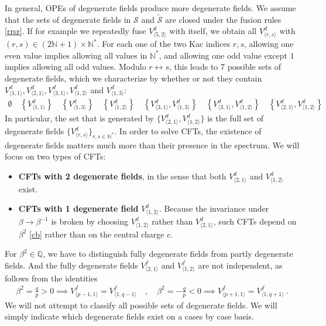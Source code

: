 \documentclass[12pt, a4paper]{article}
\theoremstyle{break}
\begin{document}
In general, OPEs of degenerate fields produce more degenerate fields. We assume that the sets of degenerate fields in $\mathcal{S}$ and $\widetilde{\mathcal{S}}$ are closed under the fusion rules \eqref{rrsr}. If for example we repeatedly fuse $V^d_{\langle 5,2\rangle}$ with itself, we obtain all $V^d_{\langle r,s\rangle}$ with $(r,s)\in (2\mathbb{N}+1)\times \mathbb{N}^*$. For each one of the two Kac indices $r,s$, allowing one even value implies allowing all values in $\mathbb{N}^*$, and allowing one odd value except $1$ implies allowing all odd values. Modulo $r\leftrightarrow s$, this leads to 7 possible sets of degenerate fields, which we characterize by whether or not they contain $V^d_{\langle 1,1\rangle}, V^d_{\langle 2,1\rangle},V^d_{\langle 3,1\rangle},V^d_{\langle 1,2\rangle}$ and $V^d_{\langle 1,3\rangle}$:
\begin{align}
  \emptyset \quad \left\{V^d_{\langle 1,1\rangle}\right\}  \quad \left\{V^d_{\langle 1,3\rangle}\right\} \quad \left\{V^d_{\langle 1,2\rangle}\right\} 
  \quad 
  \left\{V^d_{\langle 3,1\rangle},V^d_{\langle 1,3\rangle}\right\} \quad 
  \left\{V^d_{\langle 3,1\rangle},V^d_{\langle 1,2\rangle}\right\} \quad 
  \left\{V^d_{\langle 2,1\rangle},V^d_{\langle 1,2\rangle}\right\} 
 \label{degsets}
\end{align}
In particular, the set that is generated by $\{V^d_{\langle 2,1\rangle},V^d_{\langle 1,2\rangle}\} $ is the full set of degenerate fields $\{V^d_{\langle r,s\rangle}\}_{r,s\in\mathbb{N}^*}$. 
In order to solve CFTs, the existence of degenerate fields matters much more than their presence in the spectrum. We will focus on two types of CFTs:
\begin{itemize}
 \item \textbf{CFTs with 2 degenerate fields}, in the sense that both $V^d_{\langle 2,1\rangle}$ and $V^d_{\langle 1,2\rangle}$ exist. 
 \item \textbf{CFTs with 1 degenerate field} $V^d_{\langle 1,2\rangle}$. Because the invariance under $\beta\to \beta^{-1}$ is broken by choosing $V^d_{\langle 1,2\rangle}$ rather than $V^d_{\langle 2,1\rangle}$, such CFTs depend on $\beta^2$ \eqref{cb} rather than on the central charge $c$. 
\end{itemize}
For $\beta^2\in\mathbb{Q}$, we have to distinguish fully degenerate fields from partly degenerate fields. And the fully degenerate fields $V^f_{\langle 2,1\rangle}$ and $V^f_{\langle 1,2\rangle}$ are not independent, as follows from the identities
\begin{align}
 \beta^2 =\frac{q}{p}>0 \implies V^f_{\langle p-1,1\rangle} = V^f_{\langle 1,q-1\rangle} \quad , \quad  \beta^2 =-\frac{q}{p}<0 \implies V^f_{\langle p+1,1\rangle} = V^f_{\langle 1,q+1\rangle}\ . 
\end{align}
We will not attempt to classify all possible sets of degenerate fields. We will simply indicate which degenerate fields exist on a cases by case basis. 
\end{document}
